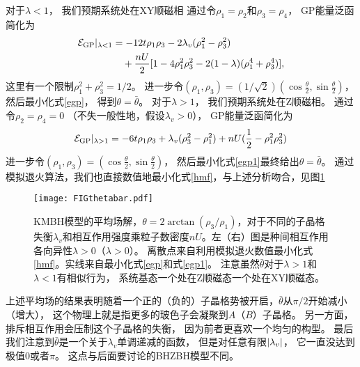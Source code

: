 对于$\lambda < 1$，
我们预期系统处在XY顺磁相
通过令$\rho_1=\rho_2$和$\rho_3=\rho_4$，
GP能量泛函简化为
\begin{equation}\label{egp}
\begin{split}
	\mathcal E_{\textnormal{GP}}\vert_{\lambda<1} &=-12t \rho_1\rho_3- 2 \lambda_v (\rho_1^2-\rho_3^2)\\
	&\quad +\frac{nU}{2}[1-4\rho_1^2 \rho_3^2-2(1-\lambda)(\rho_1^4+\rho_3^4)],
\end{split}
\end{equation}
这里有一个限制$\rho_1^2+\rho_3^2=1/2$。
进一步令$(\rho_1,\rho_3)=(1/\sqrt{2})(\cos \frac{\theta}{2},\sin\frac{\theta}{2})$，
然后最小化式\eqref{egp}，
得到$\theta=\bar \theta$。
对于$\lambda > 1$，
我们预期系统处在Z顺磁相。
通过令$\rho_2=\rho_4=0$
（不失一般性地，假设$\lambda_v>0$），
GP能量泛函简化为
\begin{equation}\label{egp1}
	\mathcal E_{\textnormal{GP}}\vert_{\lambda>1} = -6t \rho_1 \rho_3 + \lambda_v (\rho_3^2 - \rho_1^2) + nU(\frac{1}{2}-\rho_1^2 \rho_3^2)
\end{equation}
进一步令$(\rho_1,\rho_3)=(\cos \frac{\theta}{2},\sin\frac{\theta}{2})$，
然后最小化式\eqref{egp1}最终给出$\theta=\bar \theta $。
通过模拟退火算法，我们也直接数值地最小化式\eqref{hmf}，与上述分析吻合，见图\ref{KMBHtheta}%
\begin{figure}
	\texttt{[image: FIGthetabar.pdf]}
	\caption{KMBH模型的平均场解，$\theta=2\arctan(\rho_3/\rho_1)$，对于不同的子晶格失衡$\lambda_v$和相互作用强度乘粒子数密度$nU$。左（右）图是种间相互作用各向异性$\lambda>0$（$\lambda>0$）。
	离散点来自利用模拟退火数值最小化式\eqref{hmf}。实线来自最小化式\eqref{egp}和式\eqref{egp1}。
	注意虽然$\bar\theta$对于$\lambda>1$和$\lambda<1$有相似行为，
	系统基态一个处在Z顺磁态一个处在XY顺磁态。}
	\label{KMBHtheta}
\end{figure}
上述平均场的结果表明随着一个正的（负的）子晶格势被开启，$\bar \theta$从$\pi/2$开始减小（增大），
这个物理上就是指更多的玻色子会凝聚到$A$（$B$）子晶格。
另一方面，排斥相互作用会压制这个子晶格的失衡，
因为前者更喜欢一个均匀的构型。
最后我们注意到$\bar \theta$是一个关于$\lambda_v$单调递减的函数，
但是对任意有限$\abs{\lambda_v}$，
它一直没达到极值$0$或者$\pi$。
这点与后面要讨论的BHZBH模型不同。

